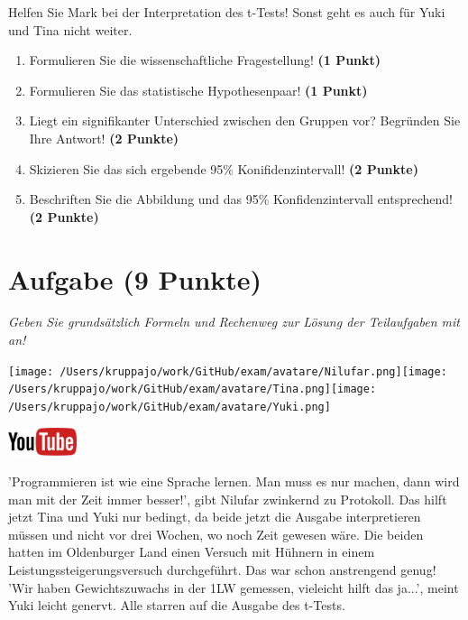 \documentclass[a4paper, 9pt]{scrartcl}\usepackage[]{graphicx}\usepackage[]{xcolor}
\begin{document}
Helfen Sie Mark bei der Interpretation des t-Tests! Sonst geht es auch für Yuki und Tina nicht weiter.

\begin{enumerate}
  \item Formulieren Sie die wissenschaftliche Fragestellung! \textbf{(1 Punkt)}
  \item Formulieren Sie das statistische Hypothesenpaar! \textbf{(1 Punkt)}
\item Liegt ein signifikanter Unterschied zwischen den Gruppen vor? Begründen Sie Ihre Antwort! \textbf{(2 Punkte)}
\item Skizieren Sie das sich ergebende 95\% Konifidenzintervall! \textbf{(2 Punkte)}
\item Beschriften Sie die Abbildung und das 95\% Konfidenzintervall entsprechend! \textbf{(2 Punkte)}  
\end{enumerate} 
\clearpage

\section{Aufgabe \hfill (9 Punkte)}

\textit{Geben Sie grundsätzlich Formeln und Rechenweg zur Lösung der Teilaufgaben mit an!} \\[1Ex]
 

 
\begin{minipage}[t]{0.5\textwidth}
\texttt{[image: /Users/kruppajo/work/GitHub/exam/avatare/Nilufar.png]}\hspace{-4mm}\texttt{[image: /Users/kruppajo/work/GitHub/exam/avatare/Tina.png]}\hspace{-4mm}\texttt{[image: /Users/kruppajo/work/GitHub/exam/avatare/Yuki.png]}
\end{minipage}
\begin{minipage}[t]{0.5\textwidth}
\hfill
\href{https://youtu.be/w62HJlbN28U}{\includegraphics[width = 2cm]{img/youtube}}
\end{minipage}
\vspace{1ex}



'Programmieren ist wie eine Sprache lernen. Man muss es nur machen, dann wird man mit der Zeit immer besser!', gibt Nilufar zwinkernd zu Protokoll. Das hilft jetzt Tina und Yuki nur bedingt, da beide jetzt die \Rlogo Ausgabe interpretieren müssen und nicht vor drei Wochen, wo noch Zeit gewesen wäre. Die beiden hatten im Oldenburger Land einen Versuch mit Hühnern in einem Leistungssteigerungsversuch durchgeführt. Das war schon anstrengend genug! 'Wir haben Gewichtszuwachs in der 1LW gemessen, vieleicht hilft das ja...', meint Yuki leicht genervt. Alle starren auf die \Rlogo Ausgabe des t-Tests.
\end{document}
